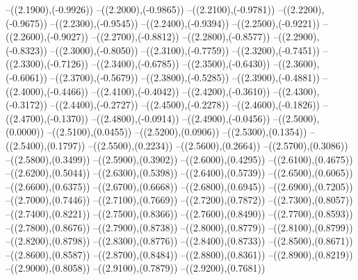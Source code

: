 {	--({\sx*(2.1900)},{\sy*(-0.9926)})
	--({\sx*(2.2000)},{\sy*(-0.9865)})
	--({\sx*(2.2100)},{\sy*(-0.9781)})
	--({\sx*(2.2200)},{\sy*(-0.9675)})
	--({\sx*(2.2300)},{\sy*(-0.9545)})
	--({\sx*(2.2400)},{\sy*(-0.9394)})
	--({\sx*(2.2500)},{\sy*(-0.9221)})
	--({\sx*(2.2600)},{\sy*(-0.9027)})
	--({\sx*(2.2700)},{\sy*(-0.8812)})
	--({\sx*(2.2800)},{\sy*(-0.8577)})
	--({\sx*(2.2900)},{\sy*(-0.8323)})
	--({\sx*(2.3000)},{\sy*(-0.8050)})
	--({\sx*(2.3100)},{\sy*(-0.7759)})
	--({\sx*(2.3200)},{\sy*(-0.7451)})
	--({\sx*(2.3300)},{\sy*(-0.7126)})
	--({\sx*(2.3400)},{\sy*(-0.6785)})
	--({\sx*(2.3500)},{\sy*(-0.6430)})
	--({\sx*(2.3600)},{\sy*(-0.6061)})
	--({\sx*(2.3700)},{\sy*(-0.5679)})
	--({\sx*(2.3800)},{\sy*(-0.5285)})
	--({\sx*(2.3900)},{\sy*(-0.4881)})
	--({\sx*(2.4000)},{\sy*(-0.4466)})
	--({\sx*(2.4100)},{\sy*(-0.4042)})
	--({\sx*(2.4200)},{\sy*(-0.3610)})
	--({\sx*(2.4300)},{\sy*(-0.3172)})
	--({\sx*(2.4400)},{\sy*(-0.2727)})
	--({\sx*(2.4500)},{\sy*(-0.2278)})
	--({\sx*(2.4600)},{\sy*(-0.1826)})
	--({\sx*(2.4700)},{\sy*(-0.1370)})
	--({\sx*(2.4800)},{\sy*(-0.0914)})
	--({\sx*(2.4900)},{\sy*(-0.0456)})
	--({\sx*(2.5000)},{\sy*(0.0000)})
	--({\sx*(2.5100)},{\sy*(0.0455)})
	--({\sx*(2.5200)},{\sy*(0.0906)})
	--({\sx*(2.5300)},{\sy*(0.1354)})
	--({\sx*(2.5400)},{\sy*(0.1797)})
	--({\sx*(2.5500)},{\sy*(0.2234)})
	--({\sx*(2.5600)},{\sy*(0.2664)})
	--({\sx*(2.5700)},{\sy*(0.3086)})
	--({\sx*(2.5800)},{\sy*(0.3499)})
	--({\sx*(2.5900)},{\sy*(0.3902)})
	--({\sx*(2.6000)},{\sy*(0.4295)})
	--({\sx*(2.6100)},{\sy*(0.4675)})
	--({\sx*(2.6200)},{\sy*(0.5044)})
	--({\sx*(2.6300)},{\sy*(0.5398)})
	--({\sx*(2.6400)},{\sy*(0.5739)})
	--({\sx*(2.6500)},{\sy*(0.6065)})
	--({\sx*(2.6600)},{\sy*(0.6375)})
	--({\sx*(2.6700)},{\sy*(0.6668)})
	--({\sx*(2.6800)},{\sy*(0.6945)})
	--({\sx*(2.6900)},{\sy*(0.7205)})
	--({\sx*(2.7000)},{\sy*(0.7446)})
	--({\sx*(2.7100)},{\sy*(0.7669)})
	--({\sx*(2.7200)},{\sy*(0.7872)})
	--({\sx*(2.7300)},{\sy*(0.8057)})
	--({\sx*(2.7400)},{\sy*(0.8221)})
	--({\sx*(2.7500)},{\sy*(0.8366)})
	--({\sx*(2.7600)},{\sy*(0.8490)})
	--({\sx*(2.7700)},{\sy*(0.8593)})
	--({\sx*(2.7800)},{\sy*(0.8676)})
	--({\sx*(2.7900)},{\sy*(0.8738)})
	--({\sx*(2.8000)},{\sy*(0.8779)})
	--({\sx*(2.8100)},{\sy*(0.8799)})
	--({\sx*(2.8200)},{\sy*(0.8798)})
	--({\sx*(2.8300)},{\sy*(0.8776)})
	--({\sx*(2.8400)},{\sy*(0.8733)})
	--({\sx*(2.8500)},{\sy*(0.8671)})
	--({\sx*(2.8600)},{\sy*(0.8587)})
	--({\sx*(2.8700)},{\sy*(0.8484)})
	--({\sx*(2.8800)},{\sy*(0.8361)})
	--({\sx*(2.8900)},{\sy*(0.8219)})
	--({\sx*(2.9000)},{\sy*(0.8058)})
	--({\sx*(2.9100)},{\sy*(0.7879)})
	--({\sx*(2.9200)},{\sy*(0.7681)})
}
